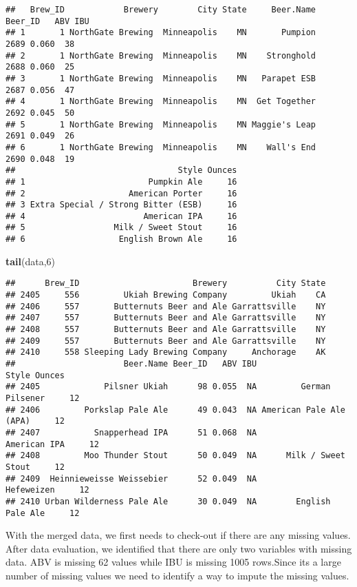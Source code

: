 \documentclass[]{article}
\newenvironment{Shaded}{\begin{snugshade}}{\end{snugshade}}
\newcommand{\DecValTok}[1]{\textcolor[rgb]{0.00,0.00,0.81}{#1}}
\newcommand{\KeywordTok}[1]{\textcolor[rgb]{0.13,0.29,0.53}{\textbf{#1}}}
\newcommand{\NormalTok}[1]{#1}
\begin{document}
\begin{verbatim}
##   Brew_ID            Brewery        City State     Beer.Name Beer_ID   ABV IBU
## 1       1 NorthGate Brewing  Minneapolis    MN       Pumpion    2689 0.060  38
## 2       1 NorthGate Brewing  Minneapolis    MN    Stronghold    2688 0.060  25
## 3       1 NorthGate Brewing  Minneapolis    MN   Parapet ESB    2687 0.056  47
## 4       1 NorthGate Brewing  Minneapolis    MN  Get Together    2692 0.045  50
## 5       1 NorthGate Brewing  Minneapolis    MN Maggie's Leap    2691 0.049  26
## 6       1 NorthGate Brewing  Minneapolis    MN    Wall's End    2690 0.048  19
##                                 Style Ounces
## 1                         Pumpkin Ale     16
## 2                     American Porter     16
## 3 Extra Special / Strong Bitter (ESB)     16
## 4                        American IPA     16
## 5                  Milk / Sweet Stout     16
## 6                   English Brown Ale     16
\end{verbatim}

\begin{Shaded}
\begin{Highlighting}[]
\KeywordTok{tail}\NormalTok{(data,}\DecValTok{6}\NormalTok{)}
\end{Highlighting}
\end{Shaded}

\begin{verbatim}
##      Brew_ID                       Brewery          City State
## 2405     556         Ukiah Brewing Company         Ukiah    CA
## 2406     557       Butternuts Beer and Ale Garrattsville    NY
## 2407     557       Butternuts Beer and Ale Garrattsville    NY
## 2408     557       Butternuts Beer and Ale Garrattsville    NY
## 2409     557       Butternuts Beer and Ale Garrattsville    NY
## 2410     558 Sleeping Lady Brewing Company     Anchorage    AK
##                      Beer.Name Beer_ID   ABV IBU                   Style Ounces
## 2405             Pilsner Ukiah      98 0.055  NA         German Pilsener     12
## 2406         Porkslap Pale Ale      49 0.043  NA American Pale Ale (APA)     12
## 2407           Snapperhead IPA      51 0.068  NA            American IPA     12
## 2408         Moo Thunder Stout      50 0.049  NA      Milk / Sweet Stout     12
## 2409  Heinnieweisse Weissebier      52 0.049  NA              Hefeweizen     12
## 2410 Urban Wilderness Pale Ale      30 0.049  NA        English Pale Ale     12
\end{verbatim}

With the merged data, we first needs to check-out if there are any
missing values. After data evaluation, we identified that there are only
two variables with missing data. ABV is missing 62 values while IBU is
missing 1005 rows.Since its a large number of missing values we need to
identify a way to impute the missing values.
\end{document}
